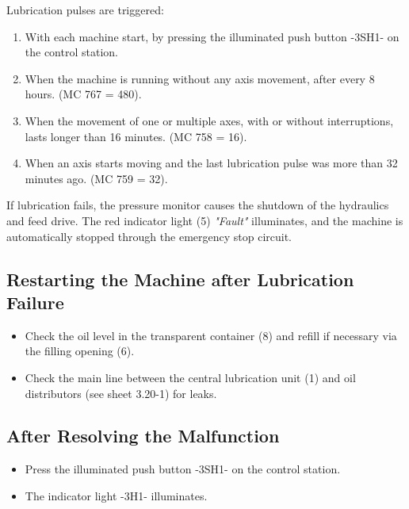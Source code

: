 Lubrication pulses are triggered:

\begin{enumerate}
    \item With each machine start, by pressing the illuminated push button -3SH1- on the control station.\footnotemark
    \item When the machine is running without any axis movement, after every 8 hours. (MC 767 = 480).
    \item When the movement of one or multiple axes, with or without interruptions, lasts longer than 16 minutes. (MC 758 = 16).
    \item When an axis starts moving and the last lubrication pulse was more than 32 minutes ago. (MC 759 = 32).
\end{enumerate}

If lubrication fails, the pressure monitor causes the shutdown of the hydraulics and feed drive. The red indicator light (5) \textit{"Fault"} illuminates, and the machine is automatically stopped through the emergency stop circuit.

\subsection*{Restarting the Machine after Lubrication Failure}

\begin{itemize}
    \item Check the oil level in the transparent container (8) and refill if necessary via the filling opening (6).\footnotemark
    \item Check the main line between the central lubrication unit (1) and oil distributors (see sheet 3.20-1) for leaks.
\end{itemize}

\subsection*{After Resolving the Malfunction}

\begin{itemize}
    \item Press the illuminated push button -3SH1- on the control station.\footnotemark[1]
    \item The indicator light -3H1- illuminates.
\end{itemize}


